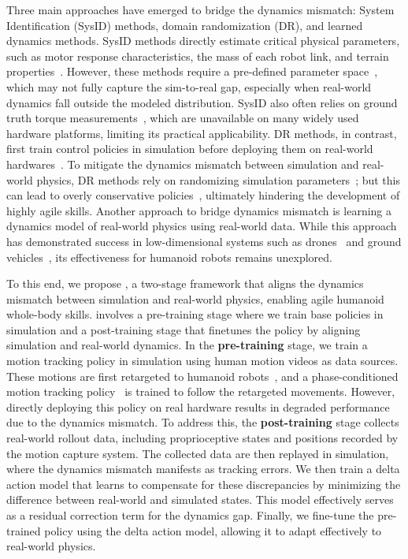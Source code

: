 Three main approaches have emerged to bridge the dynamics mismatch: System Identification (SysID) methods, domain randomization (DR), and learned dynamics methods. SysID methods directly estimate critical physical parameters, such as motor response characteristics, the mass of each robot link, and terrain properties~\cite{yu2019sim, gu2024advancing}. However, these methods require a pre-defined parameter space~\cite{ljung1998system}, which may not fully capture the sim-to-real gap, especially when real-world dynamics fall outside the modeled distribution. SysID also often relies on ground truth torque measurements~\cite{hwangbo2019learning}, which are unavailable on many widely used hardware platforms, limiting its practical applicability.
DR methods, in contrast, first train control policies in simulation before deploying them on real-world hardwares~\cite{tan2018sim, rudin2022learning, margolis2022rapid}. To mitigate the dynamics mismatch between simulation and real-world physics, DR methods rely on randomizing simulation parameters~\cite{tobin2017domain,peng2018sim}; but this can lead to overly conservative policies~\cite{he2024learning}, ultimately hindering the development of highly agile skills. Another approach to bridge dynamics mismatch is learning a dynamics model of real-world physics using real-world data. While this approach has demonstrated success in low-dimensional systems such as drones~\cite{shi2019neural} and ground vehicles~\cite{xiao2024anycar}, its effectiveness for humanoid robots remains unexplored.






To this end, we propose \method, a two-stage framework that aligns the dynamics mismatch between simulation and real-world physics, enabling agile humanoid whole-body skills. \method involves a pre-training stage where we train base policies in simulation and a post-training stage that finetunes the policy by aligning simulation and real-world dynamics. 
In the \textbf{pre-training} stage, we train a motion tracking policy in simulation using human motion videos as data sources. These motions are first retargeted to humanoid robots~\cite{he2024learning}, and a phase-conditioned motion tracking policy~\cite{peng2018deepmimic} is trained to follow the retargeted movements. However, directly deploying this policy on real hardware results in degraded performance due to the dynamics mismatch.
To address this, the \textbf{post-training} stage collects real-world rollout data, including proprioceptive states and positions recorded by the motion capture system.
The collected data are then replayed in simulation, where the dynamics mismatch manifests as tracking errors. We then train a delta action model that learns to compensate for these discrepancies by minimizing the difference between real-world and simulated states. This model effectively serves as a residual correction term for the dynamics gap. Finally, we fine-tune the pre-trained policy using the delta action model, allowing it to adapt effectively to real-world physics.



